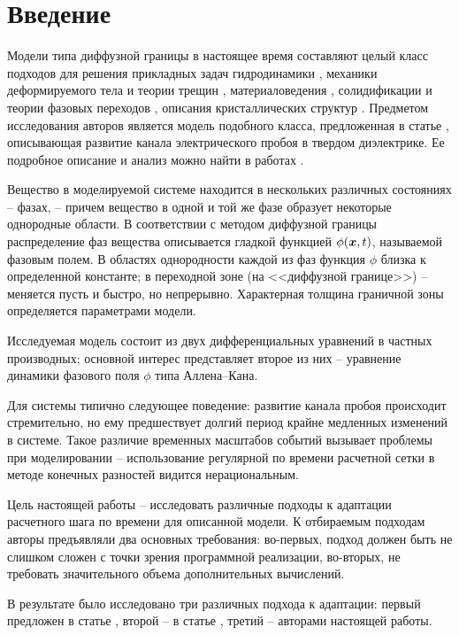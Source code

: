 
\section{Введение}

Модели типа диффузной границы в настоящее время составляют целый класс подходов для решения прикладных задач гидродинамики \cite{lamorgese_flow_modeling, kim_fluid_flows, xu_hydrodynamics}, механики деформируемого тела и теории трещин \cite{ambati_fracture}, материаловедения \cite{provatas_materials}, солидификации и теории фазовых переходов \cite{boettinger_solidification, cartalade_phase_separation, gransaly_solidification}, описания кристаллических структур \cite{emmerich_crystal, asadi_crystal, provatas_crystal}. Предметом исследования авторов является модель подобного класса, предложенная в статье \cite{pitike_dielectric_breakdown}, описывающая развитие канала электрического пробоя в твердом диэлектрике. Ее подробное описание и анализ можно найти в работах \cite{zipunova_higher_codimension, zipunova_thermomechanical, ponomarev_stability}.

Вещество в моделируемой системе находится в нескольких различных состояниях -- фазах, -- причем вещество в одной и той же фазе образует некоторые однородные области. В соответствии с методом диффузной границы распределение фаз вещества описывается гладкой функцией $\phi({\boldsymbol{x}}, t)$, называемой фазовым полем. В областях однородности каждой из фаз функция $\phi$ близка к определенной константе; в переходной зоне (на <<диффузной границе>>) -- меняется пусть и быстро, но непрерывно. Характерная толщина граничной зоны определяется параметрами модели.

Исследуемая модель состоит из двух дифференциальных уравнений в частных производных; основной интерес представляет второе из них -- уравнение динамики фазового поля $\phi$ типа Аллена--Кана.

Для системы типично следующее поведение: развитие канала пробоя происходит стремительно, но ему предшествует долгий период крайне медленных изменений в системе. Такое различие временных масштабов событий вызывает проблемы при моделировании -- использование регулярной по времени расчетной сетки в методе конечных разностей видится нерациональным.

Цель настоящей работы -- исследовать различные подходы к адаптации расчетного шага по времени для описанной модели. К отбираемым подходам авторы предъявляли два основных требования: во-первых, подход должен быть не слишком сложен с точки зрения программной реализации, во-вторых, не требовать значительного объема дополнительных вычислений.

В результате было исследовано три различных подхода к адаптации: первый предложен в статье \cite{li_time_step}, второй -- в статье \cite{zhang_time_step}, третий -- авторами настоящей работы.

